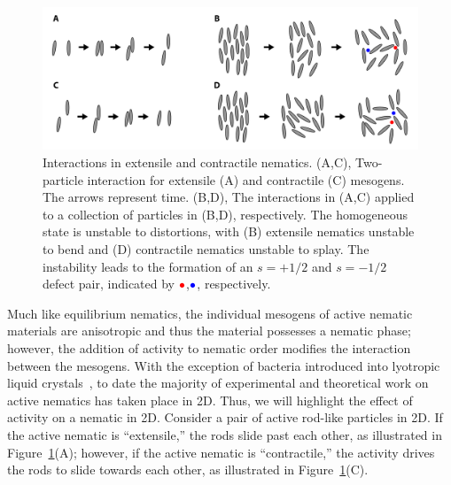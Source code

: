 \begin{figure}
  \centering
  \includegraphics{figures/C3/Ch3-Figs_ActiveInteraction.png}
  \caption{Interactions in extensile and contractile nematics.
  (A,C), Two-particle interaction for extensile (A) and contractile (C) mesogens.
  The arrows represent time.
  (B,D), The interactions in (A,C) applied to a collection of particles in (B,D), respectively.
  The homogeneous state is unstable to distortions, with (B) extensile nematics unstable to bend and (D) contractile nematics unstable to splay.
  The instability leads to the formation of an $s = + 1/2$ and $s = -1/2$ defect pair, indicated by ${\color{red} \bullet}$,${\color{blue} \bullet}$, respectively.}\label{f:3-ActiveInteraction}
\end{figure}

Much like equilibrium nematics, the individual mesogens of active nematic materials are anisotropic and thus the material possesses a nematic phase; however, the addition of activity to nematic order modifies the interaction between the mesogens.
With the exception of bacteria introduced into lyotropic liquid crystals~\cite{RN86}, to date the majority of experimental and theoretical work on active nematics has taken place in 2D.
Thus, we will highlight the effect of activity on a nematic in 2D.
Consider a pair of active rod-like particles in 2D.
If the active nematic is ``extensile,'' the rods slide past each other, as illustrated in Figure~\ref{f:3-ActiveInteraction}(A); however, if the active nematic is ``contractile,'' the activity drives the rods to slide towards each other, as illustrated in Figure~\ref{f:3-ActiveInteraction}(C).


